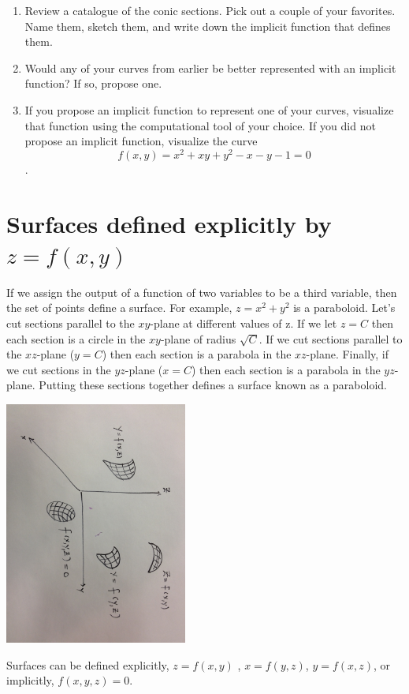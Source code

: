 \documentclass{tufte-handout}
\begin{document}
\begin{enumerate}[resume]
\item Review a catalogue of the conic sections. Pick out a couple of your favorites. Name them, sketch them, and write down the implicit function that defines them.
\item Would any of your curves from earlier be better represented with an implicit function? If so, propose one.  
\item If you propose an implicit function to represent one of your curves, visualize that function using the computational tool of your choice. If you did not propose an implicit function, visualize the curve 
\[f(x,y) = x^2 + xy + y^2 - x - y - 1=0\].
\end{enumerate}

\section{Surfaces defined explicitly by $z = f(x,y)$}

If we assign the output of a function of two variables to be a third variable, then the set of points define a surface. For example, $z = x^2 + y^2$ is a paraboloid. Let's cut sections parallel to the $xy$-plane at different values of z. If we let $z=C$ then each section is a circle in the $xy$-plane of radius $\sqrt{C}$. If we cut sections parallel to the $xz$-plane ($y=C$) then each section is a parabola in the $xz$-plane. Finally, if we cut sections in the $yz$-plane ($x=C$) then each section is a parabola in the $yz$-plane. Putting these sections together defines a surface known as a paraboloid.

\begin{marginfigure}
\includegraphics[width=6cm]{figs/surfaces}
\caption{Surfaces can be defined explicitly, $z = f(x,y)$ , $x = f(y,z)$, $y = f(x,z)$, or implicitly, $f(x,y,z)=0$.}
\end{marginfigure}
\end{document}
